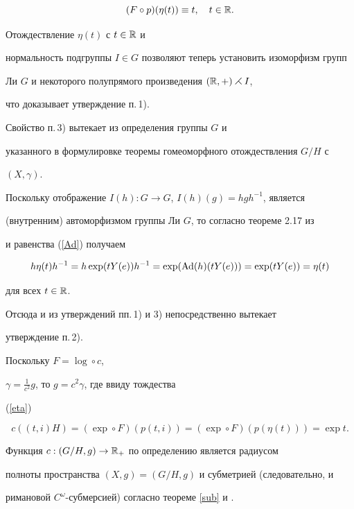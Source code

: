\begin{pf}
\begin{equation}
(F\circ{p})(\eta(t))\equiv t,\quad t\in \Bbb{R}.


\end{equation}





Отождествление $\eta(t)$ с $t\in \Bbb{R}$ и


нормальность подгруппы $I\in G$ позволяют теперь установить изоморфизм групп


Ли $G$ и некоторого полупрямого произведения $(\Bbb{R},+)\rightthreetimes I$,


что доказывает утверждение п.\,1).





Свойство п.\,3) вытекает из определения группы $G$ и


указанного в формулировке теоремы гомеоморфного отождествления $G/H$ с


$(X,\gamma)$.





Поскольку отображение $I(h):G\rightarrow G$, $I(h)(g)=hgh^{-1}$, является


(внутренним) автоморфизмом группы Ли $G$, то согласно теореме 2.17 из


\cite{A} и равенства (\ref{Ad}) получаем


$$


h\eta(t)h^{-1}=h\exp(tY(e))h^{-1}=\exp(\Ad(h)(tY(e)))=\exp(tY(e))=\eta(t)


$$


для всех $t\in \Bbb{R}$.


Отсюда и из утверждений пп.\,1) и 3) непосредственно вытекает


утверждение п.\,2).





Поскольку $F=\log\circ{c}$,


$\gamma=\frac{1}{c^{2}}g$, то $g=c^{2}\gamma$, где ввиду тождества


(\ref{eta})


$$


c((t,i)H)=(\exp\circ{F})(p(t,i))= (\exp\circ{F})(p(\eta(t)))=\exp t.


$$


Функция $c:(G/H,g)\rightarrow \Bbb{R}_{+}$ по определению является радиусом


полноты пространства $(X,g)=(G/H,g)$ и субметрией (следовательно, и


римановой $C^{\omega}$-субмерсией) согласно теореме \ref{sub} и \cite{BG}.



\end{pf}
